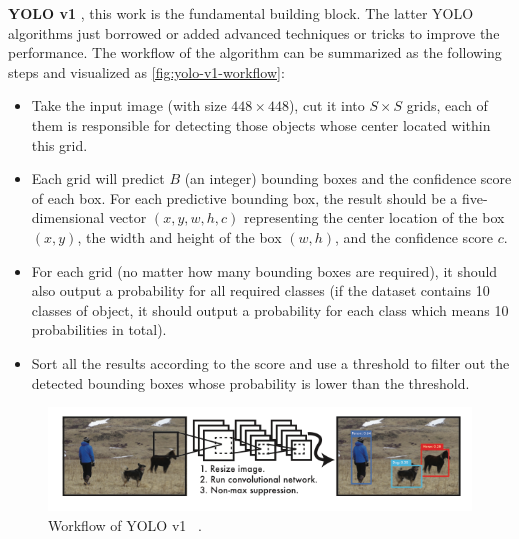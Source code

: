 \textbf{YOLO v1} \cite{yolov1-paper-2015}, this work is the fundamental
building block. The latter YOLO algorithms
just borrowed or added advanced techniques or tricks to improve the
performance. The workflow of the algorithm can
be summarized as the following steps and visualized as
\autoref{fig:yolo-v1-workflow}:

\begin{itemize}
    \item Take the input image (with size $448 \times 448$), cut it into $S
    \times S$ grids, each of them is responsible for detecting those objects
    whose center located within this grid.

    \item Each grid will predict $B$ (an integer) bounding boxes and the
    confidence score of each box. For each predictive bounding box, the result
    should be a five-dimensional vector $(x, y, w, h, c)$ representing the 
    center location of the box $(x, y)$, the width and height of the box $(w, 
    h)$, and the confidence score $c$.

    \item For each grid (no matter how many bounding boxes are required), it should
    also output a probability for all required classes (if the dataset contains
    10 classes of object, it should output a probability for each class which
    means 10 probabilities in total).

    \item Sort all the results according to the score and use a threshold to 
    filter out the detected bounding boxes whose probability is lower than the 
    threshold.
\end{itemize}

\begin{figure}
    \includegraphics[width=\linewidth]{figures/yolo_v1_workflow.png}
    \caption{Workflow of YOLO v1 ~\protect\cite{yolov1-paper-2015}.}
    \label{fig:yolo-v1-workflow}
\end{figure}

